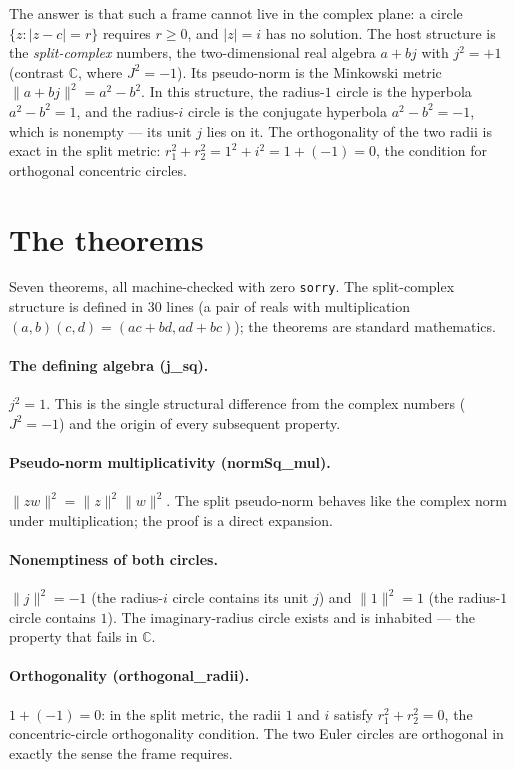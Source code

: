 \documentclass[sigplan,10pt,anonymous,review]{acmart}
\begin{document}
The answer is that such a frame cannot live in the complex plane: a
circle $\{z : |z - c| = r\}$ requires $r \ge 0$, and $|z| = i$ has no
solution. The host structure is the \emph{split-complex} numbers, the
two-dimensional real algebra $a + bj$ with $j^2 = +1$ (contrast
$\mathbb{C}$, where $J^2 = -1$). Its pseudo-norm is the Minkowski
metric $\|a + bj\|^2 = a^2 - b^2$. In this structure, the radius-$1$
circle is the hyperbola $a^2 - b^2 = 1$, and the radius-$i$ circle is
the conjugate hyperbola $a^2 - b^2 = -1$, which is nonempty --- its unit
$j$ lies on it. The orthogonality of the two radii is exact in the
split metric: $r_1^2 + r_2^2 = 1^2 + i^2 = 1 + (-1) = 0$, the condition
for orthogonal concentric circles.

\section{The theorems}

Seven theorems, all machine-checked with zero \texttt{sorry}. The
split-complex structure is defined in 30 lines (a pair of reals with
multiplication $(a,b)(c,d) = (ac + bd, ad + bc)$); the theorems are
standard mathematics.

\paragraph{The defining algebra (j\_sq).} $j^2 = 1$. This is the
single structural difference from the complex numbers ($J^2 = -1$) and
the origin of every subsequent property.

\paragraph{Pseudo-norm multiplicativity (normSq\_mul).}
$\|zw\|^2 = \|z\|^2\|w\|^2$. The split pseudo-norm behaves like the
complex norm under multiplication; the proof is a direct expansion.

\paragraph{Nonemptiness of both circles.} $\|j\|^2 = -1$ (the
radius-$i$ circle contains its unit $j$) and $\|1\|^2 = 1$ (the
radius-$1$ circle contains $1$). The imaginary-radius circle exists and
is inhabited --- the property that fails in $\mathbb{C}$.

\paragraph{Orthogonality (orthogonal\_radii).} $1 + (-1) = 0$: in the
split metric, the radii $1$ and $i$ satisfy $r_1^2 + r_2^2 = 0$, the
concentric-circle orthogonality condition. The two Euler circles are
orthogonal in exactly the sense the frame requires.
\end{document}
